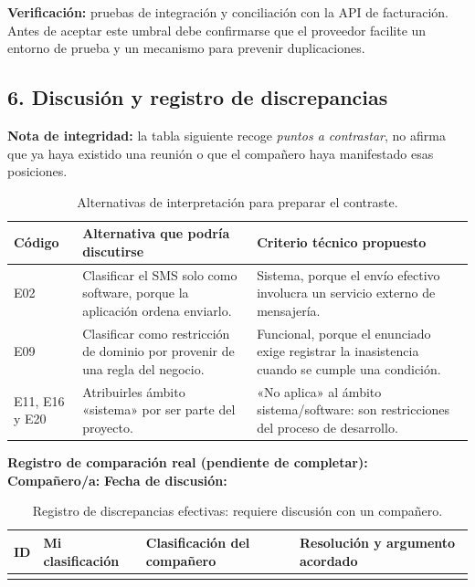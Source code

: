 \documentclass[12pt,a4paper]{article}
\begin{document}
\textbf{Verificación:} pruebas de integración y conciliación con la API de facturación. Antes de aceptar este umbral debe confirmarse que el proveedor facilite un entorno de prueba y un mecanismo para prevenir duplicaciones.


\subsection*{6. Discusión y registro de discrepancias}

\textbf{Nota de integridad:} la tabla siguiente recoge \emph{puntos a contrastar}, no afirma que ya haya existido una reunión o que el compañero haya manifestado esas posiciones.

\begin{table}[H]
\centering
\small
\begin{tabularx}{\textwidth}{|l|X|X|}
\hline
\textbf{Código} & \textbf{Alternativa que podría discutirse} & \textbf{Criterio técnico propuesto} \\ \hline

E02 &
Clasificar el SMS solo como software, porque la aplicación ordena enviarlo. &
Sistema, porque el envío efectivo involucra un servicio externo de mensajería. \\ \hline

E09 &
Clasificar como restricción de dominio por provenir de una regla del negocio. &
Funcional, porque el enunciado exige registrar la inasistencia cuando se cumple una condición. \\ \hline

E11, E16 y E20 &
Atribuirles ámbito «sistema» por ser parte del proyecto. &
«No aplica» al ámbito sistema/software: son restricciones del proceso de desarrollo. \\ \hline

\end{tabularx}
\caption{Alternativas de interpretación para preparar el contraste.}
\end{table}

\textbf{Registro de comparación real (pendiente de completar):}\\
\textbf{Compañero/a:}  \hfill \textbf{Fecha de discusión:} 

\begin{table}[H]
\centering
\small
\begin{tabularx}{\textwidth}{|l|X|X|X|}
\hline
\textbf{ID} & \textbf{Mi clasificación} & \textbf{Clasificación del compañero} & \textbf{Resolución y argumento acordado} \\ \hline

 &  &  &  \\ \hline


\end{tabularx}
\caption{Registro de discrepancias efectivas: requiere discusión con un compañero.}
\end{table}
\end{document}
